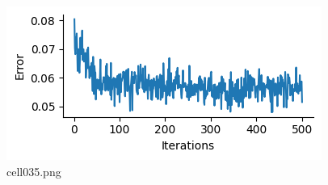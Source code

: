 \begin{figure}[ht]
	\centering
	\includegraphics[scale=0.8, max width=\linewidth]{./fig/energy-based-model/sparse-coding/cell035.png}
	\caption{cell035.png}
	\label{cell035.png}
\end{figure}